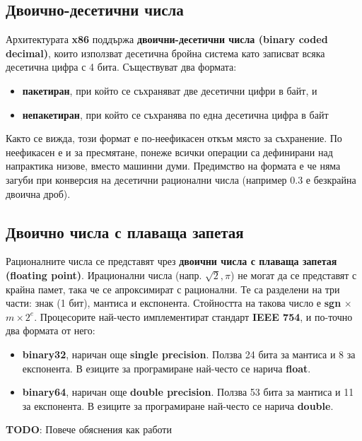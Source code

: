 \documentclass[fleqn,12pt]{article}
\begin{document}
\subsection{Двоично-десетични числа}
Архитектурата \textbf{x86} поддържа \textbf{двоични-десетични числа (binary coded decimal)}, които използват десетична бройна система като
записват всяка десетична цифра с 4 бита. Съществуват два формата:
\begin{itemize}
    \item \textbf{пакетиран}, при който се съхраняват две десетични цифри в байт, и
    \item \textbf{непакетиран}, при който се съхранява по една десетична цифра в байт
\end{itemize}
Както се вижда, този формат е по-неефикасен откъм място за съхранение. По неефикасен е и за пресмятане, понеже всички операции са 
дефинирани над напрактика низове, вместо машинни думи. Предимство на формата е че няма загуби при конверсия на десетични рационални числа
(например $0.3$ е безкрайна двоична дроб).

\subsection{Двоично числа с плаваща запетая}
Рационалните числа се представят чрез \textbf{двоични числа с плаваща запетая (floating point)}.
Ирационални числа (напр. $\sqrt{2}, \pi$) не могат да се представят с крайна памет, така че се апроксимират с рационални.
Те са разделени на три части: знак (1 бит), мантиса и експонента. Стойността на такова число е \textbf{sgn} $ \times $ $ m \times 2^e$.
Процесорите най-често имплементират стандарт \textbf{IEEE 754}, и по-точно два формата от него:
\begin{itemize}
    \item \textbf{binary32}, наричан още \textbf{single precision}. Ползва 24 бита за мантиса и 8 за експонента. В езиците за програмиране най-често се нарича \textbf{float}.
    \item \textbf{binary64}, наричан още \textbf{double precision}. Ползва 53 бита за мантиса и 11 за експонента. В езиците за програмиране най-често се нарича \textbf{double}.
\end{itemize}

\textbf{TODO}: Повече обяснения как работи
\end{document}
